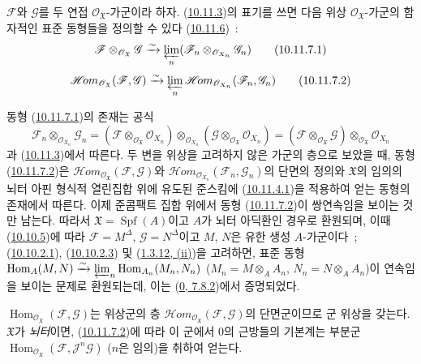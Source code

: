 \begin{proposition}[10.11.7]
\label{I.10.11.7-ko}
$\mathscr{F}$와 $\mathscr{G}$를 두 연접
$\mathscr{O}_{\mathfrak{X}}$-가군이라 하자.
(\hyperref[I.10.11.3-ko]{10.11.3})의 표기를 쓰면 다음 위상
$\mathscr{O}_{\mathfrak{X}}$-가군의 함자적인 표준 동형들을 정의할 수 있다
(\hyperref[I.10.11.6-ko]{10.11.6})~:
\[
  \label{I.10.11.7.1-ko}
  \mathscr{F}\otimes_{\mathscr{O}_{\mathfrak{X}}}\mathscr{G}
  \xrightarrow{\sim}
  \varprojlim_n
  (\mathscr{F}_n\otimes_{\mathscr{O}_{X_n}}\mathscr{G}_n)
  \tag{10.11.7.1}
\]
\[
  \label{I.10.11.7.2-ko}
  \mathscr{H}\!om_{\mathscr{O}_{\mathfrak{X}}}
  (\mathscr{F},\mathscr{G})
  \xrightarrow{\sim}
  \varprojlim_n
  \mathscr{H}\!om_{\mathscr{O}_{X_n}}(\mathscr{F}_n,\mathscr{G}_n)
  \tag{10.11.7.2}
\]
\end{proposition}

동형 (\hyperref[I.10.11.7.1-ko]{10.11.7.1})의 존재는 공식
\[
  \mathscr{F}_n\otimes_{\mathscr{O}_{X_n}}\mathscr{G}_n
  =
  (\mathscr{F}\otimes_{\mathscr{O}_{\mathfrak{X}}}
  \mathscr{O}_{X_n})
  \otimes_{\mathscr{O}_{X_n}}
  (\mathscr{G}\otimes_{\mathscr{O}_{\mathfrak{X}}}
  \mathscr{O}_{X_n})
  =
  (\mathscr{F}\otimes_{\mathscr{O}_{\mathfrak{X}}}\mathscr{G})
  \otimes_{\mathscr{O}_{\mathfrak{X}}}\mathscr{O}_{X_n}
\]
과 (\hyperref[I.10.11.3-ko]{10.11.3})에서 따른다. 두 변을 위상을
고려하지 않은 가군의 층으로 보았을 때, 동형
(\hyperref[I.10.11.7.2-ko]{10.11.7.2})은
$\mathscr{H}\!om_{\mathscr{O}_{\mathfrak{X}}}
(\mathscr{F},\mathscr{G})$와
$\mathscr{H}\!om_{\mathscr{O}_{X_n}}(\mathscr{F}_n,\mathscr{G}_n)$의
단면의 정의와 $\mathfrak{X}$의 임의의 뇌터 아핀 형식적 열린집합 위에
유도된 준스킴에 (\hyperref[I.10.11.4.1-ko]{10.11.4.1})을 적용하여 얻는
동형의 존재에서 따른다. 이제 준콤팩트 집합 위에서 동형
(\hyperref[I.10.11.7.2-ko]{10.11.7.2})이 쌍연속임을 보이는 것만 남는다.
따라서 $\mathfrak{X}=\operatorname{Spf}(A)$이고 $A$가 뇌터 아딕환인
경우로 환원되며, 이때 (\hyperref[I.10.10.5-ko]{10.10.5})에 따라
$\mathscr{F}=M^\Delta$, $\mathscr{G}=N^\Delta$이고 $M$, $N$은 유한 생성
$A$-가군이다~; (\hyperref[I.10.10.2.1-ko]{10.10.2.1}),
(\hyperref[I.10.10.2.3-ko]{10.10.2.3}) 및
(\hyperref[I.1.3.12-ko]{1.3.12, (ii)})을 고려하면, 표준 동형
$\operatorname{Hom}_A(M,N)\xrightarrow{\sim}
\varprojlim_n\operatorname{Hom}_{A_n}(M_n,N_n)$
($M_n=M\otimes_A A_n$, $N_n=N\otimes_A A_n$)이 연속임을 보이는 문제로
환원되는데, 이는 (\hyperref[0.7.8.2-ko]{0, 7.8.2})에서 증명되었다.

\begin{env}[10.11.8]
\label{I.10.11.8-ko}
$\operatorname{Hom}_{\mathscr{O}_{\mathfrak{X}}}
(\mathscr{F},\mathscr{G})$는 위상군의 층
$\mathscr{H}\!om_{\mathscr{O}_{\mathfrak{X}}}
(\mathscr{F},\mathscr{G})$의 단면군이므로 군 위상을 갖는다.
$\mathfrak{X}$가 \emph{뇌터}이면,
(\hyperref[I.10.11.7.2-ko]{10.11.7.2})에 따라 이 군에서 $0$의 근방들의
기본계는 부분군
$\operatorname{Hom}_{\mathscr{O}_{\mathfrak{X}}}
(\mathscr{F},\mathscr{J}^n\mathscr{G})$ ($n$은 임의)을 취하여 얻는다.
\end{env}

